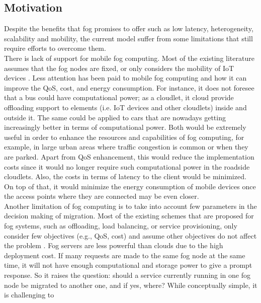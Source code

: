 \subsection{Motivation}\label{subsec:Motivation}
\noindent\tab Despite the benefits that fog promises to offer such as low
latency, heterogeneity, scalability and mobility, the current model suffer from
some limitations that still require efforts to overcome them.\\
\noindent\tab There is lack of support for mobile fog computing. Most of the
existing literature assumes that the fog nodes are fixed, or only considers the
mobility of IoT devices \cite{yousefpour2018all}. Less attention has been paid
to mobile fog computing and how it can improve the QoS, cost, and energy
consumption. For instance, it does not foresee that a bus could have
computational power; as a cloudlet, it cloud provide offloading support to
elements (i.e. IoT devices and other cloudlets) inside and outside it. The same
could be applied to cars that are nowadays getting increasingly better in terms
of computational power. Both would be extremely useful in order to enhance the
resources and capabilities of fog computing, for example, in large urban areas
where traffic congestion is common or when they are parked. Apart from QoS
enhancement, this would reduce the implementation costs since it would no longer
require such computational power in the roadside cloudlets. Also, the costs in
terms of latency to the client would be minimized. On top of that, it would
minimize the energy consumption of mobile devices once the access points where
they are connected may be even closer.\\
\noindent\tab Another limitation of fog computing is to take into account few
parameters in the decision making of migration. Most of the existing schemes
that are proposed for fog systems, such as offloading, load balancing, or
service provisioning, only consider few objectives (e.g., QoS, cost) and assume
other objectives do not affect the problem \cite{yousefpour2018all}. Fog servers
are less powerful than clouds due to the high deployment cost. If many requests
are made to the same fog node at the same time, it will not have enough
computational and storage power to give a prompt response. So it raises the
question: should a service currently running in one fog node be migrated to
another one, and if yes, where? While conceptually simple, it is challenging to
